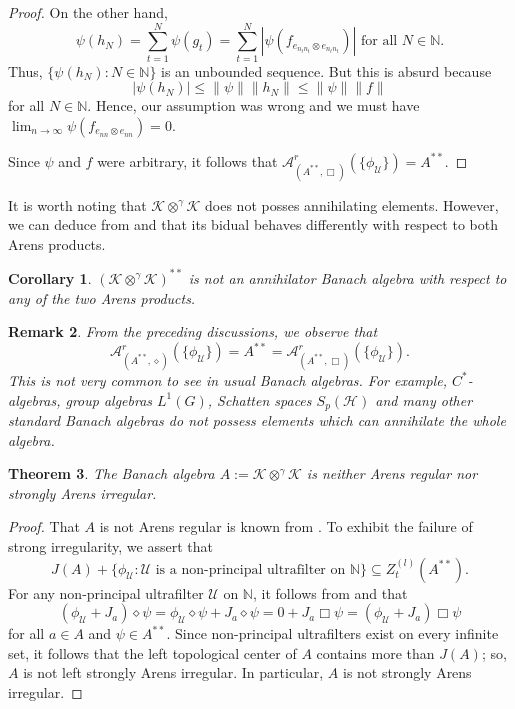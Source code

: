 \documentclass[a4]{amsart}
\theoremstyle{cupthm}
\newtheorem{thm}{Theorem}[section]
\newtheorem{cor}[thm]{Corollary}
\theoremstyle{cupdefn}
\theoremstyle{cuprem}
\newtheorem{rem}[thm]{Remark}
\numberwithin{equation}{section}
\newcommand{\obp}{\otimes^{\gamma}}
\newcommand{\N}{\mathbb N}
\newcommand{\mH}{\mathcal{H}}
\begin{document}
\begin{proof}
  On the other hand,
  \[
  \psi(h_N)=\sum_{t=1}^N\psi(g_t)=\sum_{t=1}^N|\psi(f_{
    e_{n_tn_t}\otimes e_{n_tn_t}})| \text{ for all } N \in \N.
  \]
  Thus, $\{\psi(h_N): N \in \N\}$ is an unbounded sequence. But this
  is absurd because
  \[
  |\psi(h_N)|\leq \|\psi \|\|h_N\| \leq \|\psi\| \|f\|
  \]
  for all $N \in \N$. Hence, our assumption was wrong and we must have $\lim_{n\to
    \infty}\psi(f_{ e_{nn}\otimes e_{nn}})=0$.

  Since $\psi$ and $f$ were arbitrary, it follows that
  $\mathcal{A}^r_{(A^{**},\Box)}\left(\{\phi_{\mathcal
    U}\}\right)=A^{**}.$
	\end{proof}

It is worth noting that $\mathcal K\obp\mathcal K$ does not posses
annihilating elements. However, we can deduce from 
and  that its bidual behaves differently with respect to
both Arens products.

\begin{cor}	$(\mathcal K\obp\mathcal K)^{**}$ is not an annihilator
  Banach algebra with respect to any of the two Arens products.
\end{cor}

\begin{rem}
	From the preceding discussions, we observe that
        \[
        \mathcal{A}^r_{(A^{**},\diamond)}(\{\phi_{\mathcal
          U}\})=A^{**} =
        \mathcal{A}^r_{(A^{**},\Box)}(\{\phi_{\mathcal U}\}).
        \]
        This is not very common to see in usual Banach algebras. For
        example, $C^*$-algebras, group algebras $L^1(G)$, Schatten
        spaces $S_p(\mH)$ and many other standard Banach algebras do
        not possess elements which can annihilate the whole algebra.
\end{rem}

\begin{thm} \label{JA-plus-phi-U}
The Banach algebra $A:=\mathcal K\obp\mathcal K$ is neither Arens regular nor 
strongly Arens irregular.
  \end{thm}
\begin{proof}
  That $A$ is not Arens regular is known from \cite{Lav}. To exhibit the failure of strong irregularity, we  assert that
  \[
J(A)+\{\phi_{\mathcal U} : \mathcal U \text{ is a non-principal
  ultrafilter on }\mathbb N \}\subseteq Z_t^{(l)}(A^{**}).
\]
For any non-principal ultrafilter $\mathcal{U}$ on $\N$, it follows from  and  that
  \[
  (\phi_{\mathcal U}+J_a)\diamond \psi =\phi_{\mathcal
    U}\diamond\psi+J_a\diamond \psi = 0 + J_a\Box \psi
  =(\phi_{\mathcal U}+J_a)\Box \psi
  \] for all $a \in A$ and $\psi\in A^{**}$.
  Since non-principal ultrafilters exist on every infinite set, it
  follows that the left topological center of $A$ contains more than
  $J(A)$; so, $A$ is not left strongly Arens irregular. In particular,
  $A$ is not strongly Arens irregular.
\end{proof}
\end{document}
